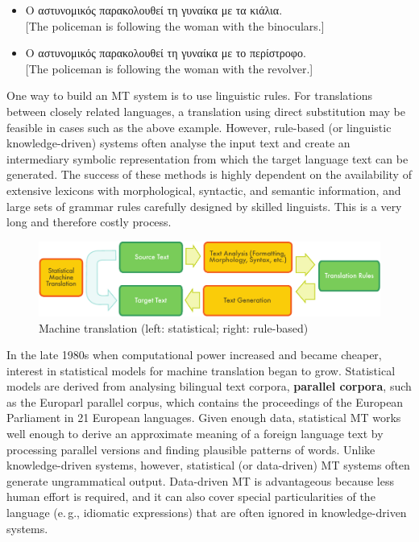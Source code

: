 \begin{multicols}{2}
\begin{itemize}
\item Ο αστυνομικός παρακολουθεί τη γυναίκα με τα κιάλια.\\
{[}The policeman is following the woman with the binoculars.{]} 
\item Ο αστυνομικός παρακολουθεί τη γυναίκα με το περίστροφο.\\
{[}The policeman is following the woman with the revolver.{]}
\end{itemize}

One way to build an MT system is to use linguistic rules. For translations between closely related languages, a translation using direct substitution may be feasible in cases such as the above example. However, rule-based (or linguistic knowledge-driven) systems often analyse the input text and create an intermediary symbolic representation from which the target language text can be generated. The success of these methods is highly dependent on the availability of extensive lexicons with morphological, syntactic, and semantic information, and large sets of grammar rules carefully designed by skilled linguists. This is a very long and therefore costly process.

\begin{figure}[htb]
  \center
  \includegraphics[width=\textwidth]{../_media/english/machine_translation}
  \caption{Machine translation (left: statistical; right: rule-based)}
\label{fig:mtarch_en}
\end{figure}
 
In the late 1980s when computational power increased and became cheaper, interest in statistical models for machine translation began to grow. Statistical models are derived from analysing bilingual text corpora, \textbf{parallel corpora}, such as the Europarl parallel corpus, which contains the proceedings of the European Parliament in 21 European languages. Given enough data, statistical MT works well enough to derive an approximate meaning of a foreign language text by processing parallel versions and finding plausible patterns of words. Unlike knowledge-driven systems, however, statistical (or data-driven) MT systems often generate ungrammatical output. Data-driven MT is advantageous because less human effort is required, and it can also cover special particularities of the language (e.\,g., idiomatic expressions) that are often ignored in knowledge-driven systems. 


\end{multicols}
